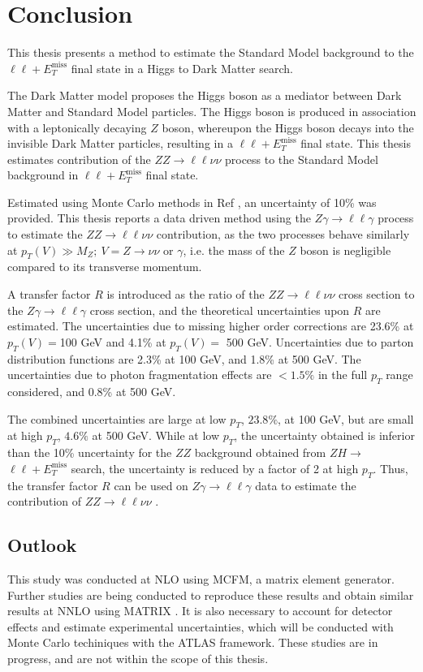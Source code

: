 \documentclass[12pt,a4paper,openright,twoside]{report}
\newcommand{\ZZ}{$ZZ\to \ell\ell\nu\nu$ }
\newcommand{\Zg}{$Z\gamma\to \ell\ell\gamma$ }
\newcommand{\llM}{$\ell\ell+E_T^{\mathrm{miss}}$ }
\begin{document}
\chapter{Conclusion}
This thesis presents a method to estimate the Standard Model background to the \llM final state in a Higgs to Dark Matter search. 

The Dark Matter model proposes the Higgs boson as a mediator between Dark Matter and Standard Model particles. The Higgs boson is produced in association with a leptonically decaying $Z$ boson, whereupon the Higgs boson decays into the invisible Dark Matter particles, resulting in a \llM final state. This thesis estimates contribution of the \ZZ process to the Standard Model background in \llM final state.

Estimated using Monte Carlo methods in Ref \cite{ZH_ATLAS}, an uncertainty of 10\% was provided. This thesis reports a data driven method using the \Zg process to estimate the \ZZ contribution, as the two processes behave similarly at $p_T(V) \gg M_Z;\ V=Z\to\nu\nu$ or $\gamma$, i.e. the mass of the $Z$ boson is negligible compared to its transverse momentum.

A transfer factor $R$ is introduced as the ratio of the \ZZ cross section to the \Zg cross section, and the theoretical uncertainties upon $R$ are estimated. The uncertainties due to missing higher order corrections are 23.6\% at $p_T(V)=$100 GeV and 4.1\% at $p_T(V)=$ 500 GeV. Uncertainties due to parton distribution functions are 2.3\% at 100 GeV, and 1.8\% at 500 GeV. The uncertainties due to photon fragmentation effects are $<1.5\%$ in the full $p_T$ range considered, and 0.8\% at 500 GeV. 

The combined uncertainties are large at low $p_T$, $23.8\%$, at 100 GeV, but are small at high $p_T$, $4.6\%$ at 500 GeV. While at low $p_T$, the uncertainty obtained is inferior than the 10\% uncertainty for the $ZZ$ background obtained from $ZH\to$\llM search, the uncertainty is reduced by a factor of 2 at high $p_T$. Thus, the transfer factor $R$ can be used on \Zg data to estimate the contribution of \ZZ.

\section{Outlook}
This study was conducted at NLO using MCFM, a matrix element generator. Further studies are being conducted to reproduce these results and obtain similar results at NNLO using MATRIX \cite{MATRIX}. It is also necessary to account for detector effects and estimate experimental uncertainties, which will be conducted with Monte Carlo techiniques with the ATLAS framework. These studies are in progress, and are not within the scope of this thesis.
\end{document}
